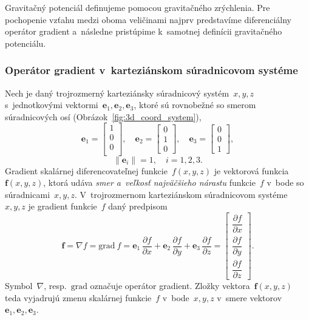 \documentclass[a4paper, 12pt]{book}
\newcommand{\grad}{\mathrm{grad}}
\let\vec\mathbf
\begin{document}
Gravitačný potenciál definujeme pomocou gravitačného zrýchlenia.  Pre 
pochopenie vzťahu medzi oboma veličinami najprv predstavíme diferenciálny 
operátor gradient a~následne pristúpime k~samotnej definícii gravitačného 
potenciálu.

\subsubsection{Operátor gradient v~karteziánskom súradnicovom systéme}
\label{sec:gradient}

Nech je daný trojrozmerný karteziánsky súradnicový systém~$x, y, z$ 
s~jednotkovými vektormi~$\vec e_1, \vec e_2, \vec e_3$, ktoré sú rovnobežné so 
smerom súradnicových osí (Obrázok~\ref{fig:3d_coord_system}),
%
\begin{equation}
\label{eq:unit_vectors}
\vec e_1 =
\begin{bmatrix}
1\\
0\\
0\\
\end{bmatrix}
{,} \quad
%
\vec e_2 =
\begin{bmatrix}
0\\
1\\
0
\end{bmatrix}
%
{,}\quad
%
\vec e_3 =
\begin{bmatrix}
0\\
0\\
1
\end{bmatrix}
{,}
\end{equation}
%
\begin{equation}
\label{eq:unit_vectors_unit_length}
\| \vec e_i \| = 1{,} \quad i = 1, 2,3{.}
\end{equation}
%
Gradient skalárnej diferencovateľnej funkcie~$f(x, y, z)$ je vektorová 
funkcia~$\vec f(x, y, z)$, ktorá udáva \emph{smer a~veľkosť najväčšieho 
nárastu} funkcie~$f$ v~bode so súradnicami~$x, y, z$.  V~trojrozmernom 
karteziánskom súradnicovom systéme~$x, y, z$ je gradient funkcie~$f$ daný 
predpisom
%
\begin{equation}
\label{eq:gradient}
\vec f = \nabla f = \grad \ f = \vec e_1 \, \frac{\partial f}{\partial x} 
+ \vec e_2 \, \frac{\partial
f}{\partial y} + \vec e_3 \, \frac{\partial f}{\partial z} =
\begin{bmatrix}
\dfrac{\partial f}{\partial x}\\[2ex]
\dfrac{\partial f}{\partial y}\\[2ex]
\dfrac{\partial f}{\partial z}
\end{bmatrix}
{.}
\end{equation}
%
Symbol~$\nabla$, resp.~$\grad$ označuje operátor gradient.  Zložky 
vektora~$\vec f(x, y, z)$ teda vyjadrujú zmenu skalárnej funkcie~$f$ v~bode~$x, 
y, z$ v~smere vektorov~$\vec e_1, \vec e_2, \vec e_3$.
\end{document}
